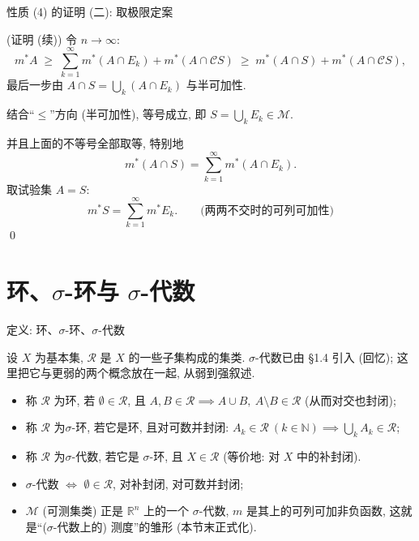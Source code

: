 
\begin{frame}{性质 (4) 的证明 (二): 取极限定案}

\startproof[bg=yellow, fg=red](证明 (续))
令 $n \to \infty$:
\[
m^* A \;\geqslant\; \sum_{k=1}^\infty m^* (A \cap E_k) + m^* (A \cap \mathscr{C} S)
\;\geqslant\; m^* (A \cap S) + m^* (A \cap \mathscr{C} S),
\]
最后一步由 $A \cap S = \bigcup_k (A \cap E_k)$ 与半可加性.

\pause

结合``$\leqslant$''方向 (半可加性), 等号成立, 即 $S = \bigcup_k E_k \in \mathscr{M}$.

\pause

并且上面的不等号全部取等, 特别地
\[
m^* (A \cap S) = \sum_{k=1}^\infty m^* (A \cap E_k).
\]
取试验集 $A = S$:
\[
m^* S = \sum_{k=1}^\infty m^* E_k . \qquad \text{(两两不交时的可列可加性)}
\]
\qed

\end{frame}


\section[环与 $\sigma$-代数]{环、$\sigma$-环与 $\sigma$-代数}


\begin{frame}{定义: 环、$\sigma$-环、$\sigma$-代数}

设 $X$ 为基本集, $\mathscr{R}$ 是 $X$ 的一些子集构成的集类. $\sigma$-代数已由 §1.4 引入 (回忆); 这里把它与更弱的两个概念放在一起, 从弱到强叙述.

\begin{Def}
\begin{itemize}
\item 称 $\mathscr{R}$ 为\alert{环}, 若 $\emptyset \in \mathscr{R}$, 且 $A, B \in \mathscr{R} \implies A \cup B,\ A \setminus B \in \mathscr{R}$ (从而对交也封闭);
\item 称 $\mathscr{R}$ 为\alert{$\sigma$-环}, 若它是环, 且对\alert{可数并}封闭: $A_k \in \mathscr{R}\ (k \in \mathbb{N}) \implies \bigcup_k A_k \in \mathscr{R}$;
\item 称 $\mathscr{R}$ 为\alert{$\sigma$-代数}, 若它是 $\sigma$-环, 且 $X \in \mathscr{R}$ (等价地: 对 $X$ 中的补封闭).
\end{itemize}
\end{Def}

\pause

\begin{remark}
\begin{itemize}
\item $\sigma$-代数 $\iff$ $\emptyset \in \mathscr{R}$, 对补封闭, 对可数并封闭;
\item $\mathscr{M}$ (可测集类) 正是 $\mathbb{R}^n$ 上的一个 $\sigma$-代数, $m$ 是其上的\alert{可列可加非负函数}, 这就是``($\sigma$-代数上的) 测度''的雏形 (本节末正式化).
\end{itemize}
\end{remark}

\end{frame}

